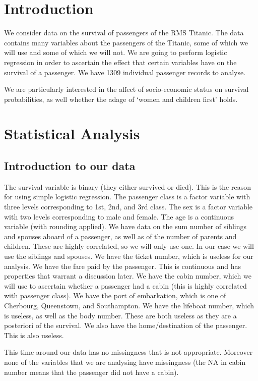 \documentclass[]{extarticle}
\begin{document}
\section{Introduction}

We consider data on the survival of passengers of the RMS Titanic. The data contains many variables about the passengers of the Titanic, some of which we will use and some of which we will not. We are going to perform logistic regression in order to ascertain the effect that certain variables have on the survival of a passenger. We have 1309 individual passenger records to analyse. 

We are particularly interested in the affect of socio-economic status on survival probabilities, as well whether the adage of `women and children first' holds.

\section{Statistical Analysis}

\subsection{Introduction to our data}

The survival variable is binary (they either survived or died). This is the reason for using simple logistic regression. The passenger class is a factor variable with three levels corresponding to 1st, 2nd, and 3rd class. The sex is a factor variable with two levels corresponding to male and female. The age is a continuous variable (with rounding applied). We have data on the sum number of siblings and spouses aboard of a passenger, as well as of the number of parents and children. These are highly correlated, so we will only use one. In our case we will use the siblings and spouses. We have the ticket number, which is useless for our analysis. We have the fare paid by the passenger. This is continuous and has properties that warrant a discussion later. We have the cabin number, which we will use to ascertain whether a passenger had a cabin (this is highly correlated with passenger class). We have the port of embarkation, which is one of Cherbourg, Queenstown, and Southampton. We have the lifeboat number, which is useless, as well as the body number. These are both useless as they are a posteriori of the survival. We also have the home/destination of the passenger. This is also useless.

This time around our data has no missingness that is not appropriate. Moreover none of the variables that we are analysing have missingness (the NA in cabin number means that the passenger did not have a cabin). 
\end{document}
